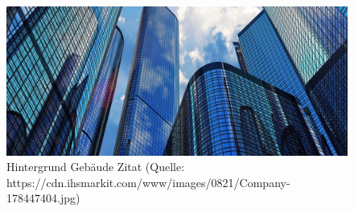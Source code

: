 \begin{figure}[htb]
	\centering
	\includegraphics[width=\textwidth]{img/backgroundCompany.png}
	\caption[Hintergrund Gebäude Zitat (Quelle: https://cdn.ihsmarkit.com/www/images/0821/Company-178447404.jpg
	)]{Hintergrund Gebäude Zitat (Quelle: https://cdn.ihsmarkit.com/www/images/0821/Company-178447404.jpg)}
	\label{fig:backgroundCompany}
\end{figure}
